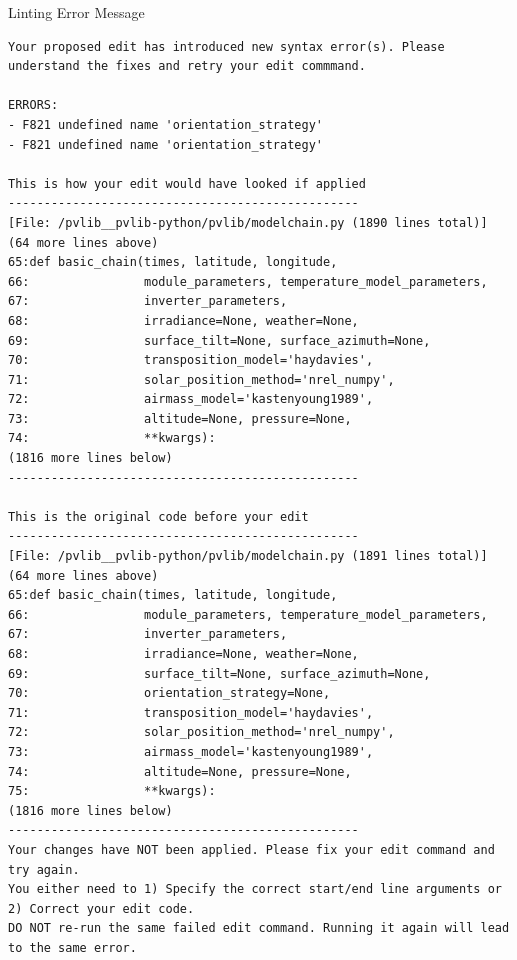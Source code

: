 {
\captionsetup{type=figure}
\begin{fileviewerbox}{Linting Error Message}
\begin{Verbatim}[breaklines=true]
Your proposed edit has introduced new syntax error(s). Please understand the fixes and retry your edit commmand.

ERRORS:
- F821 undefined name 'orientation_strategy'
- F821 undefined name 'orientation_strategy'

This is how your edit would have looked if applied
-------------------------------------------------
[File: /pvlib__pvlib-python/pvlib/modelchain.py (1890 lines total)]
(64 more lines above)
65:def basic_chain(times, latitude, longitude,
66:                module_parameters, temperature_model_parameters,
67:                inverter_parameters,
68:                irradiance=None, weather=None,
69:                surface_tilt=None, surface_azimuth=None,
70:                transposition_model='haydavies',
71:                solar_position_method='nrel_numpy',
72:                airmass_model='kastenyoung1989',
73:                altitude=None, pressure=None,
74:                **kwargs):
(1816 more lines below)
-------------------------------------------------

This is the original code before your edit
-------------------------------------------------
[File: /pvlib__pvlib-python/pvlib/modelchain.py (1891 lines total)]
(64 more lines above)
65:def basic_chain(times, latitude, longitude,
66:                module_parameters, temperature_model_parameters,
67:                inverter_parameters,
68:                irradiance=None, weather=None,
69:                surface_tilt=None, surface_azimuth=None,
70:                orientation_strategy=None,
71:                transposition_model='haydavies',
72:                solar_position_method='nrel_numpy',
73:                airmass_model='kastenyoung1989',
74:                altitude=None, pressure=None,
75:                **kwargs):
(1816 more lines below)
-------------------------------------------------
Your changes have NOT been applied. Please fix your edit command and try again.
You either need to 1) Specify the correct start/end line arguments or 2) Correct your edit code.
DO NOT re-run the same failed edit command. Running it again will lead to the same error.
\end{Verbatim}
\end{fileviewerbox}
\label{fig.prompts.linting}
}